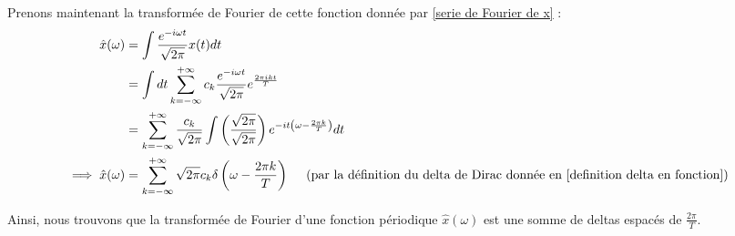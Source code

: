 \documentclass[../notesdecours.tex]{subfiles}
\begin{document}
Prenons maintenant la transformée de Fourier de cette fonction donnée par \ref{serie de Fourier de x} :
\begin{align}
\hat{x} (\omega ) &= \int \frac{e^{-i\omega t}}{\sqrt{2\pi}} x(t) dt \notag \\
&= \int dt \sum_{k = -\infty}^{+\infty} c_k \frac{e^{-i\omega t}}{\sqrt{2 \pi}} e^{\frac{2 \pi i k t}{T}} \notag \\
&= \sum_{k = -\infty}^{+\infty} \frac{c_k}{\sqrt{2 \pi}} \int \left( \frac{\sqrt{2 \pi}}{\sqrt{2 \pi}} \right) e^{-it \left( \omega - \frac{2 \pi k}{T} \right)} dt \notag \\
\implies \hat{x}(\omega) &= \sum_{k = -\infty}^{+\infty} \sqrt{2 \pi} c_k \delta \left( \omega - \frac{2 \pi k}{T} \right) \quad \mbox{ (par la définition du delta de Dirac donnée en \ref{definition delta en fonction})}
\end{align}

Ainsi, nous trouvons que la transformée de Fourier d'une fonction périodique $\hat{x}(\omega)$ est une somme de deltas espacés de $\frac{2\pi}{T}$. 
\end{document}
